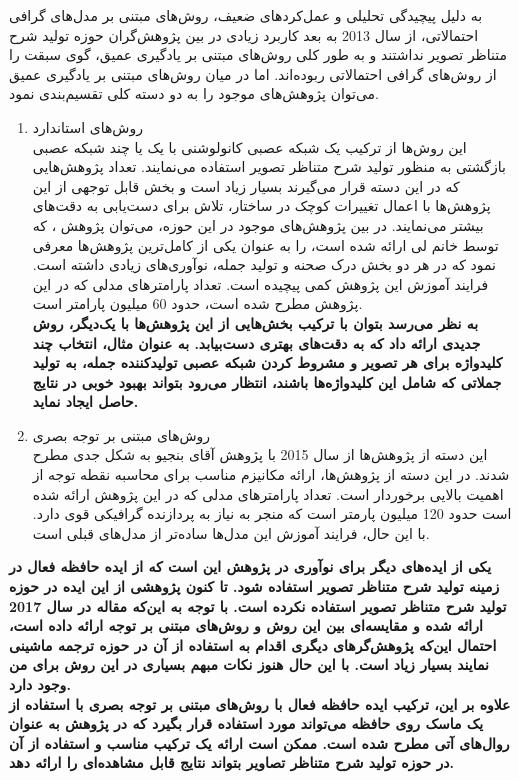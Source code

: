 به دلیل پیچیدگی تحلیلی و عمل‌کردهای ضعیف، روش‌های مبتنی بر مدل‌های گرافی احتمالاتی، از سال 2013 به بعد کاربرد زیادی در بین پژوهش‌گران حوزه تولید شرح متناظر تصویر نداشتند و به طور کلی روش‌های مبتنی بر یادگیری عمیق، گوی سبقت را از روش‌های گرافی احتمالاتی ربوده‌اند. اما در میان روش‌های مبتنی بر یادگیری عمیق می‌توان پژوهش‌های موجود را به دو دسته کلی تقسیم‌بندی نمود.
\begin{enumerate}
\item  روش‌های استاندارد \\
این روش‌ها از ترکیب یک شبکه عصبی کانولوشنی با یک یا چند شبکه عصبی بازگشتی به منظور تولید شرح متناظر تصویر استفاده می‌نمایند. تعداد پژوهش‌هایی که در این دسته قرار می‌گیرند بسیار زیاد است و بخش قابل توجهی از این پژوهش‌ها با اعمال تغییرات کوچک در ساختار، تلاش برای دست‌یابی به دقت‌های بیشتر می‌نمایند. در بین پژوهش‌های موجود در این حوزه، می‌توان پژوهش \cite{karpathy2015deep}، که توسط خانم لی ارائه شده است، را به عنوان یکی از کامل‌ترین پژوهش‌ها معرفی نمود که در هر دو بخش درک صحنه و تولید جمله، نو‌آوری‌های زیادی داشته است. فرایند آموزش این پژوهش کمی پیچیده است. تعداد پارامترهای مدلی که در این پژوهش مطرح شده است، حدود 60 میلیون پارامتر است.
\\
\textbf{به نظر می‌رسد بتوان با ترکیب بخش‌هایی از این پژوهش‌ها با یک‌دیگر، روش جدیدی ارائه داد که به دقت‌های بهتری دست‌بیابد. به عنوان مثال، انتخاب چند کلیدواژه برای هر تصویر و مشروط کردن شبکه عصبی تولید‌کننده جمله، به تولید جملاتی که شامل این کلید‌واژه‌ها باشند، انتظار می‌رود بتواند بهبود خوبی در نتایج حاصل ایجاد نماید.}
\item  روش‌های مبتنی بر توجه بصری \\
این دسته‌ از پژوهش‌ها از سال 2015 با پژوهش آقای بنجیو \cite{xu2015show} به شکل جدی مطرح شدند. در این دسته از پژوهش‌ها، ارائه مکانیزم مناسب برای محاسبه نقطه توجه از اهمیت بالایی برخوردار است. تعداد پارامترهای مدلی که در این پژوهش ارائه شده است حدود 120 میلیون پارمتر است که منجر به نیاز به پردازنده گرافیکی قوی دارد. با این حال، فرایند آموزش این مدل‌ها ساده‌تر از مدل‌های قبلی است.
\end{enumerate}
\textbf{ 
یکی از ایده‌های دیگر برای نوآوری در پژوهش این است که از ایده حافظه فعال در زمینه تولید شرح متناظر تصویر استفاده شود. تا کنون پژوهشی از این ایده در حوزه تولید شرح متناظر تصویر استفاده نکرده است. با توجه به این‌که مقاله \cite{lukas2017can} در سال 2017 ارائه شده و مقایسه‌ای بین این روش و روش‌های مبتنی بر توجه ارائه داده است، احتمال این‌که پژوهش‌گر‌های دیگری اقدام به استفاده از آن در حوزه ترجمه ماشینی نمایند بسیار زیاد است. با این حال هنوز نکات مبهم بسیاری در این روش برای من وجود دارد. 
\\
علاوه بر این، ترکیب ایده حافظه فعال با روش‌های مبتنی بر توجه بصری با استفاده از یک ماسک روی حافظه می‌تواند مورد استفاده قرار بگیرد که در پژوهش \cite{lukas2017can} به عنوان روال‌های آتی مطرح شده است. ممکن است ارائه یک ترکیب مناسب و استفاده از آن در حوزه تولید شرح متناظر تصاویر بتواند نتایج قابل مشاهده‌ای را ارائه دهد.
}

